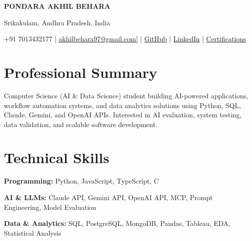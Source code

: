 \documentclass[11pt,a4paper]{article}
\begin{document}
\renewcommand{\baselinestretch}{1.05}
\selectfont


\begin{center}

{\Huge\color{DARKBLUE}\textbf{PONDARA AKHIL BEHARA}}

\vspace{3pt}

Srikakulam, Andhra Pradesh, India

\vspace{3pt}

+91 7013432177
\textcolor{ACCENTBLUE}{|}
\href{mailto:akhilbehara97@gmail.com}{akhilbehara97@gmail.com]}
\textcolor{ACCENTBLUE}{|}
\href{https://github.com/akhilbehara999}{GitHub}
\textcolor{ACCENTBLUE}{|}
\href{https://www.linkedin.com/in/pondara-akhil-behara-016126381}{LinkedIn}
\textcolor{ACCENTBLUE}{|}
\href{https://drive.google.com/drive/folders/1NILiLOGCmGQi88opwFHKlOdwTx4rjTDo?usp=drive_link}{Certifications}
\end{center}


\section*{Professional Summary}

Computer Science (AI \& Data Science) student building AI-powered applications, workflow automation systems, and data analytics solutions using Python, SQL, Claude, Gemini, and OpenAI APIs. Interested in AI evaluation, system testing, data validation, and scalable software development.


\section*{Technical Skills}

\textbf{Programming:}
Python, JavaScript, TypeScript, C

\textbf{AI \& LLMs:}
Claude API, Gemini API, OpenAI API, MCP, Prompt Engineering, Model Evaluation

\textbf{Data \& Analytics:}
SQL, PostgreSQL, MongoDB, Pandas, Tableau, EDA, Statistical Analysis
\end{document}
